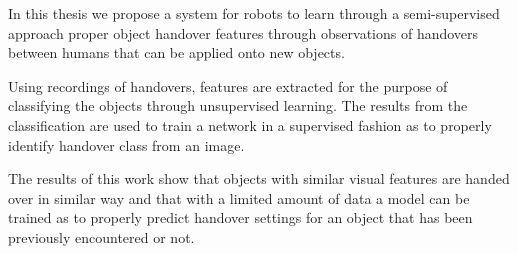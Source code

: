 In this thesis we propose a system for robots to learn through a semi-supervised approach proper object handover features through observations of handovers between humans that can be applied onto new objects.

Using recordings of handovers, features are extracted for the purpose of classifying the objects through unsupervised learning. The results from the classification are used to train a network in a supervised fashion as to properly identify handover class from an image.

The results of this work show that objects with similar visual features are handed over in similar way and that with a limited amount of data a model can be trained as to properly predict handover settings for an object that has been previously encountered or not.
